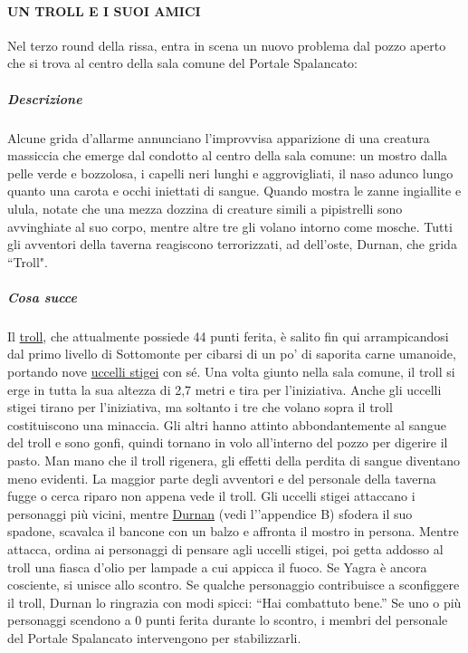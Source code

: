 \documentclass{article}
\begin{document}
\paragraph{UN TROLL E I SUOI AMICI}
Nel terzo round della rissa, entra in scena un nuovo
problema dal pozzo aperto che si trova al centro della sala
comune del Portale Spalancato:

\subparagraph{Descrizione}Alcune grida d'allarme annunciano l'improvvisa
apparizione di una creatura massiccia che emerge
dal condotto al centro della sala comune: un mostro
dalla pelle verde e bozzolosa, i capelli neri lunghi e
aggrovigliati, il naso adunco lungo quanto una carota
e occhi iniettati di sangue. Quando mostra le zanne
ingiallite e ulula, notate che una mezza dozzina di
creature simili a pipistrelli sono avvinghiate al suo corpo,
mentre altre tre gli volano intorno come mosche. Tutti
gli avventori della taverna reagiscono terrorizzati, ad dell'oste, Durnan, che grida “Troll".

\subparagraph{Cosa succe}
Il \hyperlink{troll}{ troll}, che attualmente possiede 44 punti ferita, è salito
fin qui arrampicandosi dal primo livello di Sottomonte per
cibarsi di un po' di saporita carne umanoide, portando nove
\hyperlink{uccelli}{uccelli stigei} con sé. Una volta giunto nella sala comune,
il troll si erge in tutta la sua altezza di 2,7 metri e tira per
l'iniziativa. Anche gli uccelli stigei tirano per l'iniziativa,
ma soltanto i tre che volano sopra il troll costituiscono una
minaccia. Gli altri hanno attinto abbondantemente al sangue
del troll e sono gonfi, quindi tornano in volo all’interno del
pozzo per digerire il pasto. Man mano che il troll rigenera,
gli effetti della perdita di sangue diventano meno evidenti.
La maggior parte degli avventori e del personale della
taverna fugge o cerca riparo non appena vede il troll. Gli
uccelli stigei attaccano i personaggi più vicini, mentre
\hyperlink{Duran}{Durnan} (vedi l'’appendice B) sfodera il suo spadone,
scavalca il bancone con un balzo e affronta il mostro in
persona. Mentre attacca, ordina ai personaggi di pensare
agli uccelli stigei, poi getta addosso al troll una fiasca d'olio
per lampade a cui appicca il fuoco. Se Yagra è ancora
cosciente, si unisce allo scontro. Se qualche personaggio
contribuisce a sconfiggere il troll, Durnan lo ringrazia con
modi spicci: “Hai combattuto bene.”
Se uno o più personaggi scendono a 0 punti ferita
durante lo scontro, i membri del personale del Portale
Spalancato intervengono per stabilizzarli.
\end{document}
